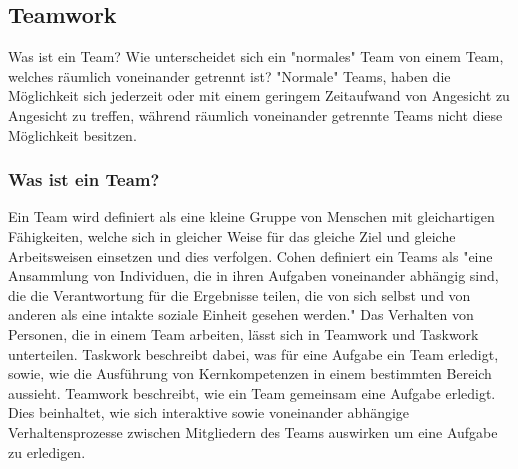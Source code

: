 \documentclass[a4paper,11pt]{article}%
\renewcommand{\\}{\vspace*{0.5\baselineskip} \newline}
\begin{document}


	





\newpage

	\subsection{Teamwork}		
Was ist ein Team? Wie unterscheidet sich ein "normales" Team von einem Team, welches räumlich voneinander getrennt ist? "Normale" Teams, haben die Möglichkeit sich jederzeit oder mit einem geringem Zeitaufwand von Angesicht zu Angesicht zu treffen, während räumlich voneinander getrennte Teams nicht diese Möglichkeit besitzen.

		\subsubsection{Was ist ein Team?}
	Ein Team wird definiert als eine kleine Gruppe von Menschen mit gleichartigen Fähigkeiten, welche sich in gleicher Weise für das gleiche Ziel und gleiche Arbeitsweisen einsetzen und dies verfolgen.\citep[p.2]{zenun2007effects} \newline
Cohen \citep[p.557]{cohen1997makes} definiert ein Teams als "eine Ansammlung von Individuen, die in ihren Aufgaben voneinander abhängig sind, die die Verantwortung für die Ergebnisse teilen, die von sich selbst und von anderen als eine intakte soziale Einheit gesehen werden."
Das Verhalten von Personen, die in einem Team arbeiten, lässt sich in \glqq Teamwork \grqq und \glqq Taskwork \grqq unterteilen. \citep[p. 541-542]{rousseau2006teamwork}
Taskwork beschreibt dabei, was für eine Aufgabe ein Team erledigt, sowie, wie die Ausführung von Kernkompetenzen in einem bestimmten Bereich aussieht. 
Teamwork beschreibt, wie ein Team gemeinsam eine Aufgabe erledigt. Dies beinhaltet, wie sich interaktive sowie voneinander abhängige Verhaltensprozesse zwischen Mitgliedern des Teams auswirken um eine Aufgabe zu erledigen. \citep[p. 357]{marks2001temporally} 
\end{document}
